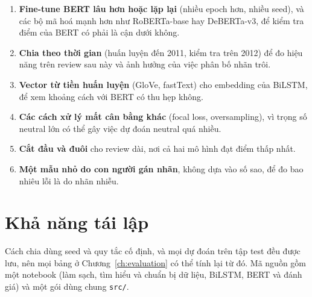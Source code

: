 \begin{enumerate}
    \item \textbf{Fine-tune BERT lâu hơn hoặc lặp lại} (nhiều epoch hơn, nhiều seed), và các bộ mã hoá mạnh hơn như RoBERTa-base hay DeBERTa-v3, để kiểm tra điểm của BERT có phải là cận dưới không.
    \item \textbf{Chia theo thời gian} (huấn luyện đến 2011, kiểm tra trên 2012) để đo hiệu năng trên review sau này và ảnh hưởng của việc phân bố nhãn trôi.
    \item \textbf{Vector từ tiền huấn luyện} (GloVe, fastText) cho embedding của BiLSTM, để xem khoảng cách với BERT có thu hẹp không.
    \item \textbf{Các cách xử lý mất cân bằng khác} (focal loss, oversampling), vì trọng số neutral lớn có thể gây việc dự đoán neutral quá nhiều.
    \item \textbf{Cắt đầu và đuôi} cho review dài, nơi cả hai mô hình đạt điểm thấp nhất.
    \item \textbf{Một mẫu nhỏ do con người gán nhãn}, không dựa vào số sao, để đo bao nhiêu lỗi là do nhãn nhiễu.
\end{enumerate}

\section{Khả năng tái lập}
\label{sec:8-4}

Cách chia dùng seed và quy tắc cố định, và mọi dự đoán trên tập test đều được lưu, nên mọi bảng ở Chương~\ref{ch:evaluation} có thể tính lại từ đó. Mã nguồn gồm một notebook (làm sạch, tìm hiểu và chuẩn bị dữ liệu, BiLSTM, BERT và đánh giá) và một gói dùng chung \texttt{src/}.
